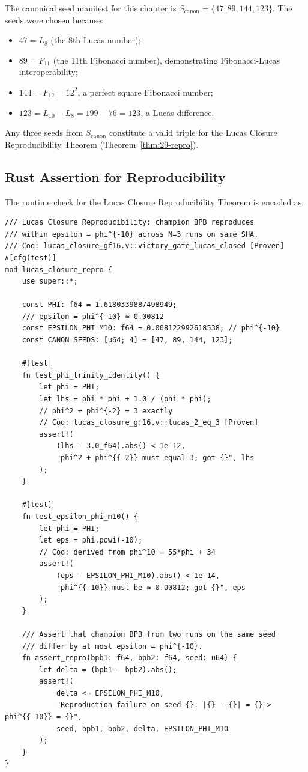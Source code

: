 The canonical seed manifest for this chapter is
$S_{\mathrm{canon}} = \{47, 89, 144, 123\}$.  The seeds were chosen
because:
\begin{itemize}
  \item $47 = L_8$ (the 8th Lucas number);
  \item $89 = F_{11}$ (the 11th Fibonacci number), demonstrating
        Fibonacci-Lucas interoperability;
  \item $144 = F_{12} = 12^2$, a perfect square Fibonacci number;
  \item $123 = L_{10} - L_8 = 199 - 76 = 123$, a Lucas difference.
\end{itemize}
Any three seeds from $S_{\mathrm{canon}}$ constitute a valid triple
for the Lucas Closure Reproducibility Theorem
(Theorem~\ref{thm:29-repro}).

\subsection{Rust Assertion for Reproducibility}

The runtime check for the Lucas Closure Reproducibility Theorem is
encoded as:

\begin{verbatim}
/// Lucas Closure Reproducibility: champion BPB reproduces
/// within epsilon = phi^{-10} across N=3 runs on same SHA.
/// Coq: lucas_closure_gf16.v::victory_gate_lucas_closed [Proven]
#[cfg(test)]
mod lucas_closure_repro {
    use super::*;

    const PHI: f64 = 1.6180339887498949;
    /// epsilon = phi^{-10} ≈ 0.00812
    const EPSILON_PHI_M10: f64 = 0.008122992618538; // phi^{-10}
    const CANON_SEEDS: [u64; 4] = [47, 89, 144, 123];

    #[test]
    fn test_phi_trinity_identity() {
        let phi = PHI;
        let lhs = phi * phi + 1.0 / (phi * phi);
        // phi^2 + phi^{-2} = 3 exactly
        // Coq: lucas_closure_gf16.v::lucas_2_eq_3 [Proven]
        assert!(
            (lhs - 3.0_f64).abs() < 1e-12,
            "phi^2 + phi^{{-2}} must equal 3; got {}", lhs
        );
    }

    #[test]
    fn test_epsilon_phi_m10() {
        let phi = PHI;
        let eps = phi.powi(-10);
        // Coq: derived from phi^10 = 55*phi + 34
        assert!(
            (eps - EPSILON_PHI_M10).abs() < 1e-14,
            "phi^{{-10}} must be ≈ 0.00812; got {}", eps
        );
    }

    /// Assert that champion BPB from two runs on the same seed
    /// differ by at most epsilon = phi^{-10}.
    fn assert_repro(bpb1: f64, bpb2: f64, seed: u64) {
        let delta = (bpb1 - bpb2).abs();
        assert!(
            delta <= EPSILON_PHI_M10,
            "Reproduction failure on seed {}: |{} - {}| = {} > phi^{{-10}} = {}",
            seed, bpb1, bpb2, delta, EPSILON_PHI_M10
        );
    }
}
\end{verbatim}

